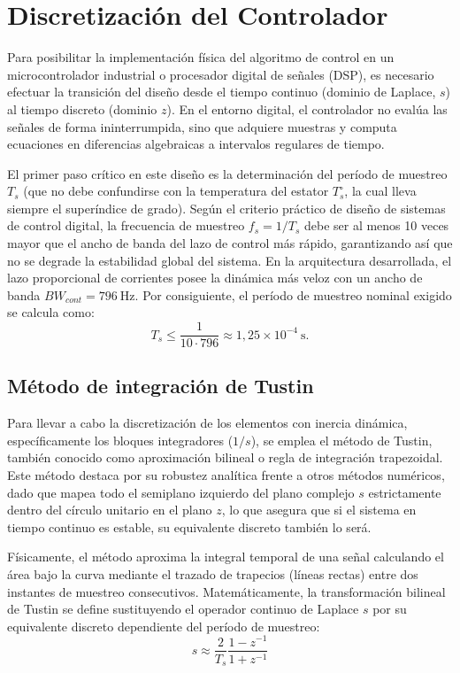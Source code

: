 \documentclass[12pt, a4paper,journal, onecolumn, compsoc]{IEEEtran}
\begin{document}
\section{Discretización del Controlador}

Para posibilitar la implementación física del algoritmo de control en un microcontrolador industrial o procesador digital de señales (DSP), es necesario efectuar la transición del diseño desde el tiempo continuo (dominio de Laplace, $s$) al tiempo discreto (dominio $z$). En el entorno digital, el controlador no evalúa las señales de forma ininterrumpida, sino que adquiere muestras y computa ecuaciones en diferencias algebraicas a intervalos regulares de tiempo.

El primer paso crítico en este diseño es la determinación del período de muestreo $T_s$ (que no debe confundirse con la temperatura del estator $T_s^\circ$, la cual lleva siempre el superíndice de grado). Según el criterio práctico de diseño de sistemas de control digital, la frecuencia de muestreo $f_s = 1/T_s$ debe ser al menos 10 veces mayor que el ancho de banda del lazo de control más rápido, garantizando así que no se degrade la estabilidad global del sistema. En la arquitectura desarrollada, el lazo proporcional de corrientes posee la dinámica más veloz con un ancho de banda $BW_{cont} = 796 \ \mathrm{Hz}$. Por consiguiente, el período de muestreo nominal exigido se calcula como:
\begin{equation}
    T_s \leq \frac{1}{10 \cdot 796} \approx 1{,}25 \times 10^{-4} \ \mathrm{s}.
\end{equation}

\subsection{Método de integración de Tustin}
Para llevar a cabo la discretización de los elementos con inercia dinámica, específicamente los bloques integradores ($1/s$), se emplea el método de Tustin, también conocido como aproximación bilineal o regla de integración trapezoidal. Este método destaca por su robustez analítica frente a otros métodos numéricos, dado que mapea todo el semiplano izquierdo del plano complejo $s$ estrictamente dentro del círculo unitario en el plano $z$, lo que asegura que si el sistema en tiempo continuo es estable, su equivalente discreto también lo será.

Físicamente, el método aproxima la integral temporal de una señal calculando el área bajo la curva mediante el trazado de trapecios (líneas rectas) entre dos instantes de muestreo consecutivos. Matemáticamente, la transformación bilineal de Tustin se define sustituyendo el operador continuo de Laplace $s$ por su equivalente discreto dependiente del período de muestreo:
\begin{equation}
    s \approx \frac{2}{T_s} \frac{1 - z^{-1}}{1 + z^{-1}}
\end{equation}
\end{document}
